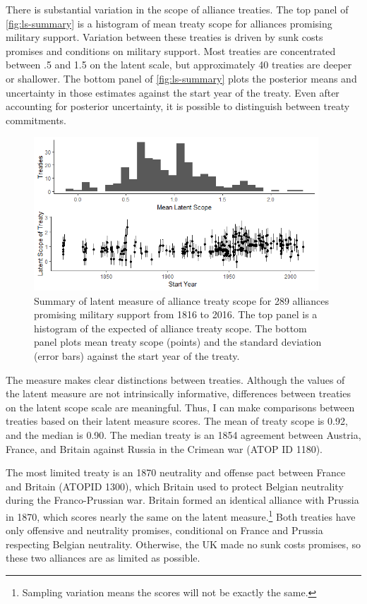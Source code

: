 \documentclass[12pt]{article}
\begin{document}
There is substantial variation in the scope of alliance treaties. 
The top panel of \autoref{fig:ls-summary} is a histogram of mean treaty scope for alliances promising military support. 
Variation between these treaties is driven by sunk costs promises and conditions on military support. 
Most treaties are concentrated between .5 and 1.5 on the latent scale, but approximately 40 treaties are deeper or shallower. 
The bottom panel of \autoref{fig:ls-summary} plots the posterior means and uncertainty in those estimates against the start year of the treaty. 
Even after accounting for posterior uncertainty, it is possible to distinguish between treaty commitments. 


\begin{figure}
	\centering
		\includegraphics[width=0.95\textwidth]{../figures/ls-summary.png}
	\caption{Summary of latent measure of alliance treaty scope for 289 alliances promising military support from 1816 to 2016. The top panel is a histogram of the expected of alliance treaty scope. The bottom panel plots mean treaty scope (points) and the standard deviation (error bars) against the start year of the treaty.}
	\label{fig:ls-summary}
\end{figure}


The measure makes clear distinctions between treaties. 
Although the values of the latent measure are not intrinsically informative, differences between treaties on the latent scope scale are meaningful. 
Thus, I can make comparisons between treaties based on their latent measure scores. 
The mean of treaty scope is 0.92, and the median is 0.90. 
The median treaty is an 1854 agreement between Austria, France, and Britain against Russia in the Crimean war (ATOP ID 1180). 


The most limited treaty is an 1870 neutrality and offense pact between France and Britain (ATOPID 1300), which Britain used to protect Belgian neutrality during the Franco-Prussian war.  
Britain formed an identical alliance with Prussia in 1870, which scores nearly the same on the latent measure.\footnote{
Sampling variation means the scores will not be exactly the same.} 
Both treaties have only offensive and neutrality promises, conditional on France and Prussia respecting Belgian neutrality. 
Otherwise, the UK made no sunk costs promises, so these two alliances are as limited as possible. 
\end{document}
